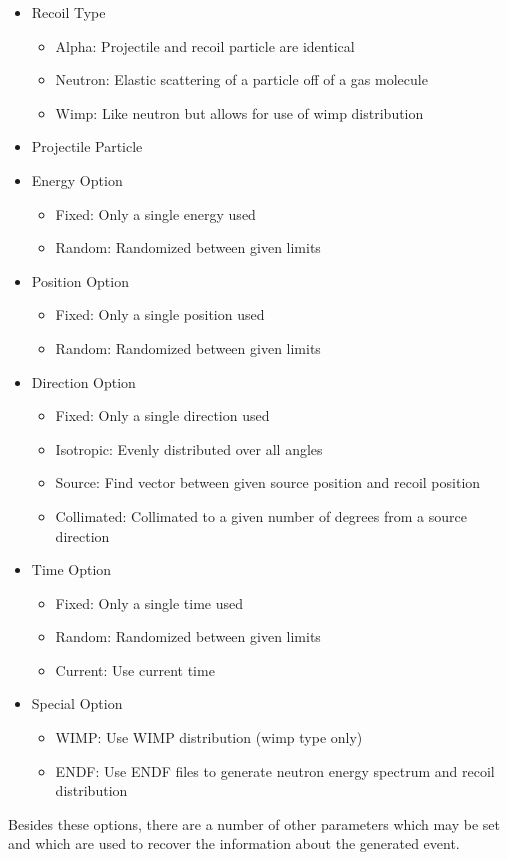 \documentclass[12pt]{article}
\begin{document}
\begin{itemize}
  \item Recoil Type
  \begin{itemize}
    \item Alpha: Projectile and recoil particle are identical
    \item Neutron: Elastic scattering of a particle off of a gas molecule
    \item Wimp: Like neutron but allows for use of wimp distribution
  \end{itemize}
  \item Projectile Particle
  \item Energy Option
  \begin{itemize}
    \item Fixed: Only a single energy used
    \item Random: Randomized between given limits
  \end{itemize}
  \item Position Option
    \begin{itemize}
    \item Fixed: Only a single position used
    \item Random: Randomized between given limits
  \end{itemize}
  \item Direction Option
    \begin{itemize}
    \item Fixed: Only a single direction used
    \item Isotropic: Evenly distributed over all angles
    \item Source: Find vector between given source position and recoil position
    \item Collimated: Collimated to a given number of degrees from a source direction
  \end{itemize}
  \item Time Option
    \begin{itemize}
    \item Fixed: Only a single time used
    \item Random: Randomized between given limits
    \item Current: Use current time
  \end{itemize}
  \item Special Option
    \begin{itemize}
    \item WIMP: Use WIMP distribution (wimp type only)
    \item ENDF: Use ENDF files to generate neutron energy spectrum and recoil distribution
  \end{itemize}
\end{itemize}
Besides these options, there are a number of other parameters which may be set and which are used
to recover the information about the generated event.  
\end{document}
